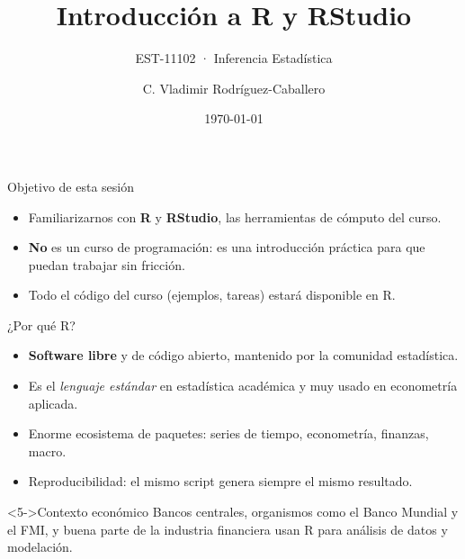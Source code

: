 \documentclass[aspectratio=169]{beamer}
\title[Introducción a R y RStudio]{Introducción a R y RStudio}
\subtitle{EST-11102 · Inferencia Estadística}
\author{C. Vladimir Rodríguez-Caballero}
\institute[ITAM]{Departamento Académico de Estadística, ITAM}
\date{\today}
\begin{document}
\begin{frame}
\titlepage
\end{frame}

\begin{frame}{Objetivo de esta sesión}
\begin{itemize}
  \item<1-> Familiarizarnos con \textbf{R} y \textbf{RStudio}, las herramientas de cómputo del curso.
  \item<2-> \textbf{No} es un curso de programación: es una introducción práctica para que puedan trabajar sin fricción.
  \item<3-> Todo el código del curso (ejemplos, tareas) estará disponible en R.
\end{itemize}
\end{frame}

\begin{frame}{¿Por qué R?}
\begin{itemize}
  \item<1-> \textbf{Software libre} y de código abierto, mantenido por la comunidad estadística.
  \item<2-> Es el \textit{lenguaje estándar} en estadística académica y muy usado en econometría aplicada.
  \item<3-> Enorme ecosistema de paquetes: series de tiempo, econometría, finanzas, macro.
  \item<4-> Reproducibilidad: el mismo script genera siempre el mismo resultado.
\end{itemize}

\begin{block}<5->{Contexto económico}
Bancos centrales, organismos como el Banco Mundial y el FMI, y buena parte de la industria financiera usan R para análisis de datos y modelación.
\end{block}
\end{frame}
\end{document}
